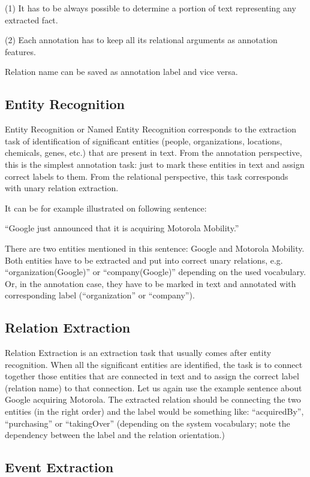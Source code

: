 (1) It has to be always possible to determine a portion of text representing any extracted fact.

(2) Each annotation has to keep all its relational arguments as annotation features.

Relation name can be saved as annotation label and vice versa.

\subsection{Entity Recognition}

Entity Recognition or Named Entity Recognition corresponds to the extraction task of identification of significant entities (people, organizations, locations, chemicals, genes, etc.) that are present in text. From the annotation perspective, this is the simplest annotation task: just to mark these entities in text and assign correct labels to them. From the relational perspective, this task corresponds with unary relation extraction.

It can be for example illustrated on following sentence:

“Google just announced that it is acquiring Motorola Mobility.”

There are two entities mentioned in this sentence: Google and Motorola Mobility. Both entities have to be extracted and put into correct unary relations, e.g. “organization(Google)” or “company(Google)” depending on the used vocabulary. Or, in the annotation case, they have to be marked in text and annotated with corresponding label (“organization” or “company”).

\subsection{Relation Extraction}

Relation Extraction is an extraction task that usually comes after entity recognition. When all the significant entities are identified, the task is to connect together those entities that are connected in text and to assign the correct label (relation name) to that connection. Let us again use the example sentence about Google acquiring Motorola. The extracted relation should be connecting the two entities (in the right order) and the label would be something like: “acquiredBy”, “purchasing” or “takingOver” (depending on the system vocabulary; note the dependency between the label and the relation orientation.)

\subsection{Event Extraction}

